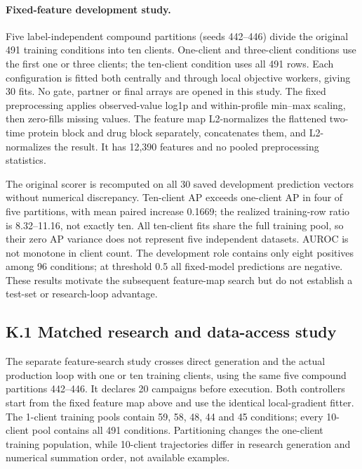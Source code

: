 \paragraph{Fixed-feature development study.}
Five label-independent compound partitions (seeds 442--446) divide the original 491 training conditions into ten clients. One-client and three-client conditions use the first one or three clients; the ten-client condition uses all 491 rows. Each configuration is fitted both centrally and through local objective workers, giving 30 fits. No gate, partner or final arrays are opened in this study. The fixed preprocessing applies observed-value log1p and within-profile min--max scaling, then zero-fills missing values. The feature map L2-normalizes the flattened two-time protein block and drug block separately, concatenates them, and L2-normalizes the result. It has 12,390 features and no pooled preprocessing statistics.

\begingroup
\renewcommand{\thetable}{K.\arabic{table}}
\renewcommand{\theHtable}{K.\arabic{table}}
\setcounter{table}{0}

\begin{table}[ht]

\end{table}
\endgroup

The original scorer is recomputed on all 30 saved development prediction vectors without numerical discrepancy. Ten-client AP exceeds one-client AP in four of five partitions, with mean paired increase 0.1669; the realized training-row ratio is 8.32--11.16, not exactly ten. All ten-client fits share the full training pool, so their zero AP variance does not represent five independent datasets. AUROC is not monotone in client count. The development role contains only eight positives among 96 conditions; at threshold 0.5 all fixed-model predictions are negative. These results motivate the subsequent feature-map search but do not establish a test-set or research-loop advantage.

\subsection*{K.1 Matched research and data-access study}
The separate feature-search study crosses direct generation and the actual production loop with one or ten training clients, using the same five compound partitions 442--446. It declares 20 campaigns before execution. Both controllers start from the fixed feature map above and use the identical local-gradient fitter. The 1-client training pools contain 59, 58, 48, 44 and 45 conditions; every 10-client pool contains all 491 conditions. Partitioning changes the one-client training population, while 10-client trajectories differ in research generation and numerical summation order, not available examples.

